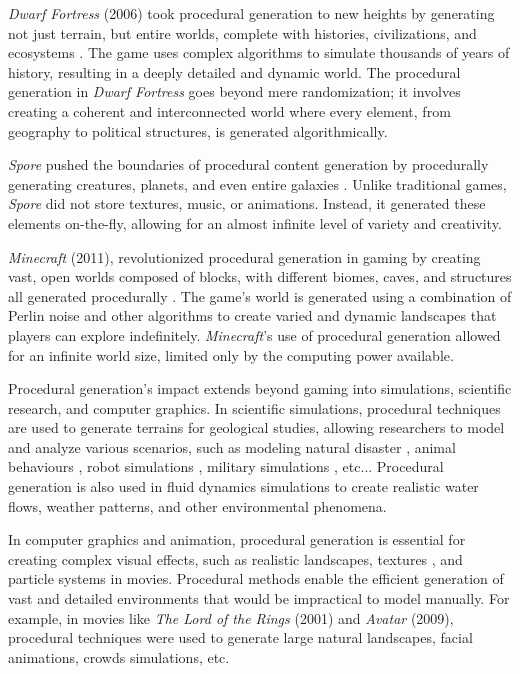 \textit{Dwarf Fortress} (2006) took procedural generation to new heights by generating not just terrain, but entire worlds, complete with histories, civilizations, and ecosystems . The game uses complex algorithms to simulate thousands of years of history, resulting in a deeply detailed and dynamic world. The procedural generation in \textit{Dwarf Fortress} goes beyond mere randomization; it involves creating a coherent and interconnected world where every element, from geography to political structures, is generated algorithmically.

\textit{Spore} pushed the boundaries of procedural content generation by procedurally generating creatures, planets, and even entire galaxies . Unlike traditional games, \textit{Spore} did not store textures, music, or animations. Instead, it generated these elements on-the-fly, allowing for an almost infinite level of variety and creativity.

\textit{Minecraft} (2011), revolutionized procedural generation in gaming by creating vast, open worlds composed of blocks, with different biomes, caves, and structures all generated procedurally . The game's world is generated using a combination of Perlin noise and other algorithms to create varied and dynamic landscapes that players can explore indefinitely. \textit{Minecraft}'s use of procedural generation allowed for an infinite world size, limited only by the computing power available.

Procedural generation's impact extends beyond gaming into simulations, scientific research, and computer graphics. In scientific simulations, procedural techniques are used to generate terrains for geological studies, allowing researchers to model and analyze various scenarios, such as modeling natural disaster \cite{Valette2005,Hudak2011,Hadrich2021}, animal behaviours \cite{Ecormier-Nocca2021,Wampler2009}, robot simulations \cite{Louis2019,Lejeune2021a}, military simulations \cite{Dam2019}, etc... Procedural generation is also used in fluid dynamics simulations to create realistic water flows, weather patterns, and other environmental phenomena.

In computer graphics and animation, procedural generation is essential for creating complex visual effects, such as realistic landscapes, textures \cite{Gobron2001}, and particle systems in movies. Procedural methods enable the efficient generation of vast and detailed environments that would be impractical to model manually. For example, in movies like \textit{The Lord of the Rings} (2001) and \textit{Avatar} (2009), procedural techniques were used to generate large natural landscapes, facial animations, crowds simulations, etc.


